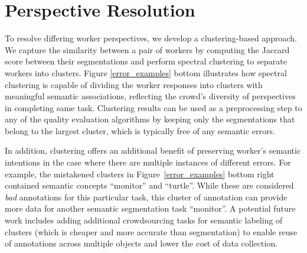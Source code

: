 \section{Perspective Resolution\label{sec:perspective}}
To resolve differing worker perspectives, we develop a clustering-based approach.
We capture the similarity between a pair of workers by computing the Jaccard score between their segmentations and perform spectral clustering to separate workers into clusters. Figure \ref{error_examples} bottom illustrates how spectral clustering is capable of dividing the worker responses into clusters with meaningful semantic associations, reflecting the crowd's diversity of perspectives in completing same task. Clustering results can be used as a preprocessing step to any of the quality evaluation algorithms by keeping only the segmentations that belong to the largest cluster, which is typically free of any semantic errors.
\par In addition, clustering offers an additional benefit of preserving worker's semantic intentions in the case where there are multiple instances of different errors. For example, the mistakened clusters in Figure~\ref{error_examples} bottom right contained semantic concepts ``monitor'' and ``turtle''. While these are considered \textit{bad} annotations for this particular task, this cluster of annotation can provide more data for another semantic segmentation task ``monitor''. A potential future work includes adding additional crowdsourcing tasks for semantic labeling of clusters (which is cheaper and more accurate than segmentation) to enable reuse of annotations across multiple objects and lower the cost of data collection. 